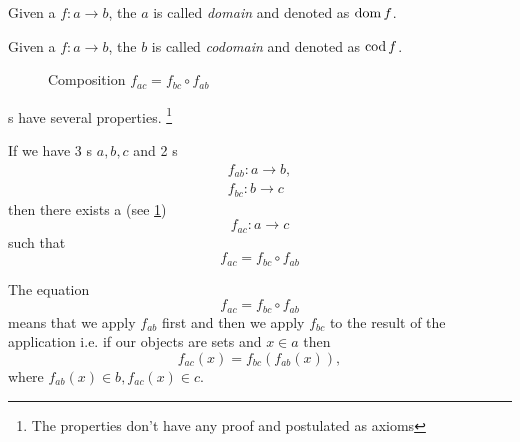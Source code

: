 \begin{definition}[Domain]
  \label{def:domain}
  Given a  $f: a \to b$, the
   $a$ is called \textit{domain} and denoted as $\operatorname{dom} f$.
\end{definition}

\begin{definition}[Codomain]
  \label{def:codomain}
  Given a  $f: a \to b$, the
   $b$ is called \textit{codomain} and denoted as $\operatorname{cod} f$.
\end{definition}

\begin{figure}[H]
  \centering
  \caption{Composition $f_{ac} = f_{bc} \circ f_{ab}$}
  \label{fig:composition}
\end{figure}

s have several properties. \footnote{The
  properties don't have any proof and postulated as axioms}
\begin{axiom}[Composition]
  \label{axm:composition}
  If we have 3 s $a, b, c$ and 2
  s 
  \begin{eqnarray}
  f_{ab} : a \rightarrow b,
  \nonumber \\
  f_{bc} : b \rightarrow c
  \nonumber 
  \end{eqnarray}
  then there exists a  (see \cref{fig:composition})
  \[
  f_{ac} : a \rightarrow c
  \]
  such that
  \[
  f_{ac} = f_{bc} \circ f_{ab}
  \]
\end{axiom}

\begin{remark}[Composition]
  \label{rem:composition}
  The equation
  \[
  f_{ac} = f_{bc} \circ f_{ab}
  \]
  means that we apply $f_{ab}$ first and then we apply $f_{bc}$ to the
  result of the application i.e. if our objects are sets and $x \in a$
  then 
  \[
  f_{ac} ( x ) = f_{bc} ( f_{ab} ( x ) ),
  \]
  where $f_{ab} ( x ) \in b, f_{ac} ( x ) \in c$.
\end{remark}


